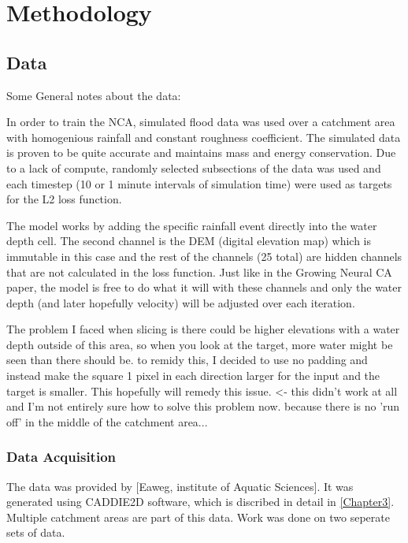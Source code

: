 
\chapter{Methodology} %
\label{Chapter4} %

\section{Data}
Some General notes about the data:

In order to train the NCA, simulated flood data was used over a catchment area with homogenious rainfall and constant roughness coefficient. The simulated data is proven to be quite accurate and maintains mass and energy conservation. Due to a lack of compute, randomly selected subsections of the data was used and each timestep (10 or 1 minute intervals of simulation time) were used as targets for the L2 loss function.

The model works by adding the specific rainfall event directly into the water depth cell. The second channel is the DEM (digital elevation map) which is immutable in this case and the rest of the channels (25 total) are hidden channels that are not calculated in the loss function. Just like in the Growing Neural CA paper, the model is free to do what it will with these channels and only the water depth (and later hopefully velocity) will be adjusted over each iteration.

The problem I faced when slicing is there could be higher elevations with a water depth outside of this area, so when you look at the target, more water might be seen than there should be. to remidy this, I decided to use no padding and instead make the square 1 pixel in each direction larger for the input and the target is smaller. This hopefully will remedy this issue. <- this didn't work at all and I'm not entirely sure how to solve this problem now. because there is no 'run off' in the middle of the catchment area...

\subsection{Data Acquisition}
The data was provided by [Eaweg, institute of Aquatic Sciences]. It was generated using CADDIE2D software, which is discribed in detail in \ref{Chapter3}. Multiple catchment areas are part of this data. Work was done on two seperate sets of data.

